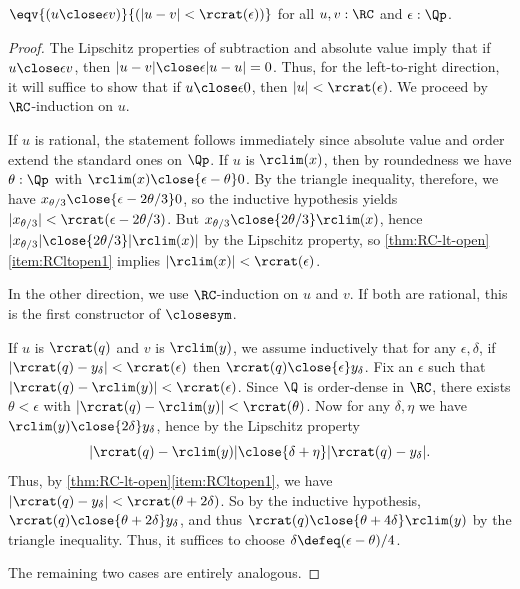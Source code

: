 %
\begin{thm} \label{RC-sim-eqv-le}
  $\eqv{(u \close\epsilon v)}{(|u - v| < \rcrat(\epsilon))}$
  for all $u, v : \RC$ and $\epsilon : \Qp$.
\end{thm}

\begin{proof}
  The Lipschitz properties of subtraction and absolute value imply that if $u\close\epsilon v$, then $|u-v| \close\epsilon |u-u| = 0$.
  Thus, for the left-to-right direction, it will suffice to show that if $u\close\epsilon 0$, then $|u|<\rcrat(\epsilon)$.
  We proceed by $\RC$-induction on $u$.

  If $u$ is rational, the statement follows immediately since absolute value and order extend the standard ones on $\Qp$.
  If $u$ is $\rclim(x)$, then by roundedness we have $\theta:\Qp$ with $\rclim(x)\close{\epsilon-\theta} 0$.
  By the triangle inequality, therefore, we have $x_{\theta/3} \close{\epsilon-2\theta/3} 0$, so the inductive hypothesis yields $|x_{\theta/3}|<\rcrat(\epsilon-2\theta/3)$.
  But $x_{\theta/3} \close{2\theta/3} \rclim(x)$, hence $|x_{\theta/3}| \close{2\theta/3} |\rclim(x)|$ by the Lipschitz property, so \cref{thm:RC-lt-open}\ref{item:RCltopen1} implies $|\rclim(x)|<\rcrat(\epsilon)$.

  In the other direction, we use $\RC$-induction on $u$ and $v$.
  If both are rational, this is the first constructor of $\closesym$.

  If $u$ is $\rcrat(q)$ and $v$ is $\rclim(y)$, we assume inductively that for any $\epsilon,\delta$, if $|\rcrat(q)-y_\delta|<\rcrat(\epsilon)$ then $\rcrat(q) \close{\epsilon} y_\delta$.
  Fix an $\epsilon$ such that $|\rcrat(q) - \rclim(y)|<\rcrat(\epsilon)$.
  Since $\Q$ is order-dense in $\RC$, there exists $\theta<\epsilon$ with $|\rcrat(q) - \rclim(y)|<\rcrat(\theta)$.
  Now for any $\delta,\eta$ we have $\rclim(y)\close{2\delta} y_\delta$, hence by the Lipschitz property
  \[ |\rcrat(q) - \rclim(y)| \close{\delta+\eta} |\rcrat(q) - y_\delta|. \]
  Thus, by \cref{thm:RC-lt-open}\ref{item:RCltopen1}, we have $|\rcrat(q) - y_\delta| < \rcrat(\theta+2\delta)$.
  So by the inductive hypothesis, $\rcrat(q) \close{\theta+2\delta} y_\delta$, and thus $\rcrat(q)\close{\theta+4\delta} \rclim(y)$ by the triangle inequality.
  Thus, it suffices to choose $\delta \defeq (\epsilon-\theta)/4$.

  The remaining two cases are entirely analogous.
\end{proof}
